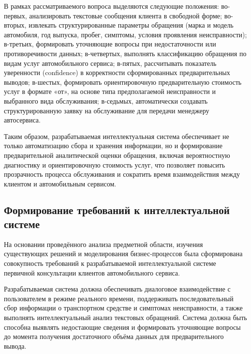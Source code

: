 \documentclass[14pt,a4paper]{extarticle}
\numberwithin{figure}{section}
\numberwithin{table}{section}
\begin{document}
В рамках рассматриваемого вопроса выделяются следующие положения: во-первых, анализировать текстовые сообщения клиента в свободной форме; во-вторых, извлекать структурированные параметры обращения (марка и модель автомобиля, год выпуска, пробег, симптомы, условия проявления неисправности); в-третьих, формировать уточняющие вопросы при недостаточности или противоречивости данных; в-четвертых, выполнять классификацию обращения по видам услуг автомобильного сервиса; в-пятых, рассчитывать показатель уверенности (confidence) в корректности сформированных предварительных выводов; в-шестых, формировать ориентировочную предварительную стоимость услуг в формате «от», на основе типа предполагаемой неисправности и выбранного вида обслуживания; в-седьмых, автоматически создавать структурированную заявку на обслуживание для передачи менеджеру автосервиса.


Таким образом, разрабатываемая интеллектуальная система обеспечивает не
только автоматизацию сбора и хранения информации, но и формирование
предварительной аналитической оценки обращения, включая вероятностную
диагностику и ориентировочную стоимость услуг, что позволяет повысить
прозрачность процесса обслуживания и сократить время взаимодействия
между клиентом и автомобильным сервисом.

\subsection{Формирование требований к интеллектуальной
системе}\label{ux444ux43eux440ux43cux438ux440ux43eux432ux430ux43dux438ux435-ux442ux440ux435ux431ux43eux432ux430ux43dux438ux439-ux43a-ux438ux43dux442ux435ux43bux43bux435ux43aux442ux443ux430ux43bux44cux43dux43eux439-ux441ux438ux441ux442ux435ux43cux435}

На основании проведённого анализа предметной области, изучения
существующих решений и моделирования бизнес-процессов была сформирована
совокупность требований к разрабатываемой интеллектуальной системе
первичной консультации клиентов автомобильного сервиса.

Разрабатываемая система должна обеспечивать диалоговое взаимодействие с
пользователем в режиме реального времени, поддерживать последовательный
сбор информации о транспортном средстве и симптомах неисправности, а
также выполнять интеллектуальный анализ текстовых обращений. Система
должна быть способна выявлять недостающие сведения и формировать
уточняющие вопросы до момента получения достаточного объёма данных для
предварительного вывода.
\end{document}
